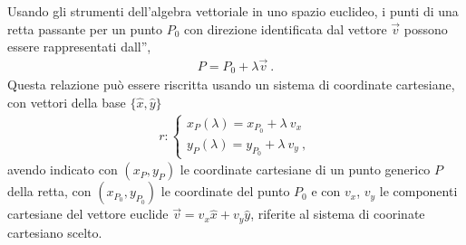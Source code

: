 \documentclass[letterpaper,10pt,italian]{jupyterBook}
\begin{document}
\sphinxAtStartPar
{} Usando gli strumenti dell’algebra vettoriale in uno spazio euclideo, i punti di una retta passante per un punto \(P_0\) con direzione identificata dal vettore \(\vec{v}\) possono essere rappresentati dall”,
\begin{equation*}
\begin{split}P = P_0 + \lambda \overrightarrow{v} \ .\end{split}
\end{equation*}
\sphinxAtStartPar
Questa relazione può essere riscritta usando un sistema di coordinate cartesiane, con vettori della base \(\{ \hat{x}, \hat{y}\}\)
\begin{equation*}
\begin{split}r: \begin{cases}
    x_P(\lambda) = x_{P_0} + \lambda \ v_x \\
    y_P(\lambda) = y_{P_0} + \lambda \ v_y \ ,
   \end{cases}
  \end{split}
\end{equation*}
\sphinxAtStartPar
avendo indicato con \((x_P, y_P)\) le coordinate cartesiane di un punto generico \(P\) della retta, con \((x_{P_0}, y_{P_0})\) le coordinate del punto \(P_0\) e con \(v_x\), \(v_y\) le componenti cartesiane del vettore euclide \(\vec{v} = v_x \hat{x} + v_y \hat{y}\), riferite al sistema di coorinate cartesiano scelto.
\end{document}
